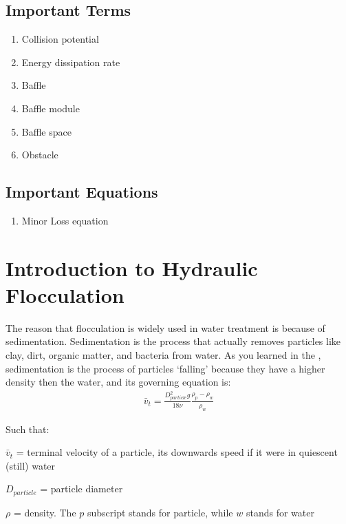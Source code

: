 \documentclass[letterpaper,10pt,english]{sphinxmanual}
\begin{document}
\subsection{Important Terms}
\label{\detokenize{Flocculation/Floc_Design:important-terms}}\begin{enumerate}
\item {} 
Collision potential

\item {} 
Energy dissipation rate

\item {} 
Baffle

\item {} 
Baffle module

\item {} 
Baffle space

\item {} 
Obstacle

\end{enumerate}


\subsection{Important Equations}
\label{\detokenize{Flocculation/Floc_Design:important-equations}}\begin{enumerate}
\item {} 
Minor Loss equation

\end{enumerate}


\section{Introduction to Hydraulic Flocculation}
\label{\detokenize{Flocculation/Floc_Design:introduction-to-hydraulic-flocculation}}
The reason that flocculation is widely used in water treatment is because of sedimentation. Sedimentation is the process that actually removes particles like clay, dirt, organic matter, and bacteria from water. As you learned in the
{\hyperref[\detokenize{Introduction/Introduction:heading-treatment-trains}]{}}, sedimentation is the process of particles ‘falling’ because they have a higher density then the water, and its governing equation is:
\begin{equation}\label{equation:Flocculation/Floc_Design:Flocculation/Floc_Design:0}
\begin{split}\bar v_t = \frac{D_{particle}^2 g}{18 \nu} \frac{\rho_p - \rho_w}{\rho_w}\end{split}
\end{equation}
\begin{DUlineblock}{0em}
\item[] Such that:
\item[] \(\bar v_t\) = terminal velocity of a particle, its downwards speed if it were in quiescent (still) water
\item[] \(D_{particle}\) = particle diameter
\item[] \(\rho\) = density. The \(p\) subscript stands for particle, while \(w\) stands for water
\end{DUlineblock}
\end{document}

